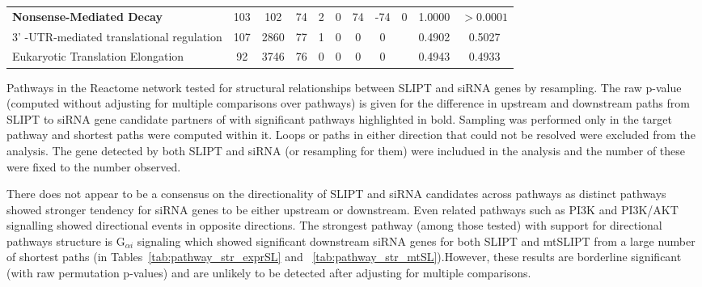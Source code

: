 \begin{table*}[!htb]
{{\begin{threeparttable}
\begin{tabular}{l|cc|cc|cccc|cc}
\rowcolor{black!5}
\textbf{Nonsense-Mediated Decay}                   & 103         & 102          & 74            & 2           & 0    & 74   & -74     & 0            & 1.0000             & $>0.0001$                   \\
\rowcolor{black!10}
3' -UTR-mediated translational regulation & 107         & 2860         & 77            & 1           & 0    & 0    & 0       &              & 0.4902             & 0.5027              \\
\rowcolor{black!5}
Eukaryotic Translation Elongation         & 92          & 3746         & 76            & 0           & 0    & 0    & 0       &              & 0.4943             & 0.4933              \\
\hline
\end{tabular}
\begin{tablenotes}
\raggedright \small
Pathways in the Reactome network tested for structural relationships between \gls{SLIPT} and \gls{siRNA} genes by resampling. The raw p-value (computed without adjusting for multiple comparisons over pathways) is given for the difference in upstream and downstream paths from \gls{SLIPT} to \gls{siRNA} gene candidate partners of  with significant pathways highlighted in bold. Sampling was performed only in the target pathway and shortest paths were computed within it. Loops or paths in either direction that could not be resolved were excluded from the analysis. The gene detected by both \gls{SLIPT} and \gls{siRNA} (or resampling for them) were includued in the analysis and the number of these were fixed to the number observed.
\end{tablenotes}
\end{threeparttable}
}
}
\end{table*}

There does not appear to be a consensus on the directionality of \gls{SLIPT} and \gls{siRNA} candidates across pathways as distinct pathways showed stronger tendency for \gls{siRNA} genes to be either upstream or downstream. Even related pathways such as \gls{PI3K} and PI3K/AKT signalling showed directional events in opposite directions. The strongest pathway (among those tested) with support for directional pathways structure is G$_{\alpha i}$ signaling which showed significant downstream \gls{siRNA} genes for both SLIPT and mtSLIPT from a large number of shortest paths (in Tables~\ref{tab:pathway_str_exprSL} and ~\ref{tab:pathway_str_mtSL}).However, these results are borderline significant (with raw permutation p-values) and are unlikely to be detected after adjusting for multiple comparisons.

